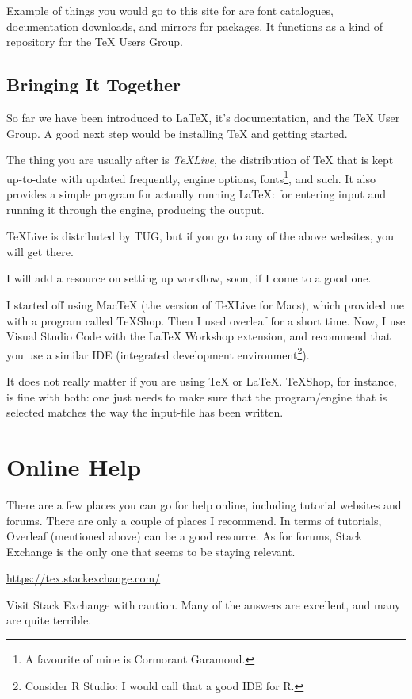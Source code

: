 \documentclass[11pt, oneside]{memoir}
\begin{document}
Example of things you would go to this site for are font catalogues, documentation downloads, and mirrors for packages. It functions as a kind of repository for the TeX Users Group.

\section{Bringing It Together}

So far we have been introduced to LaTeX, it's documentation, and the TeX User Group. A good next step would be installing TeX and getting started.

The thing you are usually after is \emph{TeXLive}, the distribution of TeX that is kept up-to-date with updated frequently, engine options, fonts\footnote{A favourite of mine is Cormorant Garamond.}, and such. It also provides a simple program for actually running LaTeX: for entering input and running it through the engine, producing the output.

TeXLive is distributed by TUG, but if you go to any of the above websites, you will get there.

I will add a resource on setting up workflow, soon, if I come to a good one.

I started off using MacTeX (the version of TeXLive for Macs), which provided me with a program called TeXShop. Then I used overleaf for a short time. Now, I use Visual Studio Code with the LaTeX Workshop extension, and recommend that you use a similar IDE (integrated development environment\footnote{Consider R Studio: I would call that a good IDE for R.}).

It does not really matter if you are using TeX or LaTeX. TeXShop, for instance, is fine with both: one just needs to make sure that the program/engine that is selected matches the way the input-file has been written.

\chapter{Online Help}

There are a few places you can go for help online, including tutorial websites and forums. There are only a couple of places I recommend. In terms of tutorials, Overleaf (mentioned above) can be a good resource. As for forums, Stack Exchange is the only one that seems to be staying relevant.

\url{https://tex.stackexchange.com/}

Visit Stack Exchange with caution. Many of the answers are excellent, and many are quite terrible.
\end{document}
